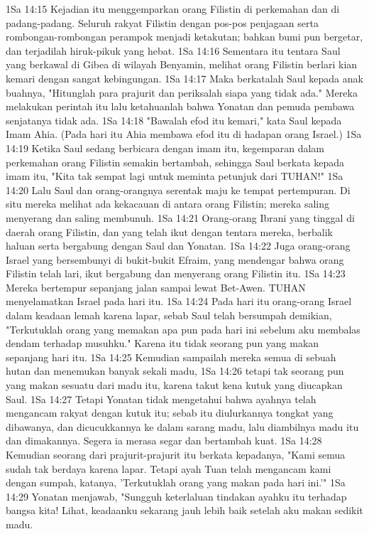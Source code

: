 1Sa 14:15  Kejadian itu menggemparkan orang Filistin di perkemahan dan di padang-padang. Seluruh rakyat Filistin dengan pos-pos penjagaan serta rombongan-rombongan perampok menjadi ketakutan; bahkan bumi pun bergetar, dan terjadilah hiruk-pikuk yang hebat.
1Sa 14:16  Sementara itu tentara Saul yang berkawal di Gibea di wilayah Benyamin, melihat orang Filistin berlari kian kemari dengan sangat kebingungan.
1Sa 14:17  Maka berkatalah Saul kepada anak buahnya, "Hitunglah para prajurit dan periksalah siapa yang tidak ada." Mereka melakukan perintah itu lalu ketahuanlah bahwa Yonatan dan pemuda pembawa senjatanya tidak ada.
1Sa 14:18  "Bawalah efod itu kemari," kata Saul kepada Imam Ahia. (Pada hari itu Ahia membawa efod itu di hadapan orang Israel.)
1Sa 14:19  Ketika Saul sedang berbicara dengan imam itu, kegemparan dalam perkemahan orang Filistin semakin bertambah, sehingga Saul berkata kepada imam itu, "Kita tak sempat lagi untuk meminta petunjuk dari TUHAN!"
1Sa 14:20  Lalu Saul dan orang-orangnya serentak maju ke tempat pertempuran. Di situ mereka melihat ada kekacauan di antara orang Filistin; mereka saling menyerang dan saling membunuh.
1Sa 14:21  Orang-orang Ibrani yang tinggal di daerah orang Filistin, dan yang telah ikut dengan tentara mereka, berbalik haluan serta bergabung dengan Saul dan Yonatan.
1Sa 14:22  Juga orang-orang Israel yang bersembunyi di bukit-bukit Efraim, yang mendengar bahwa orang Filistin telah lari, ikut bergabung dan menyerang orang Filistin itu.
1Sa 14:23  Mereka bertempur sepanjang jalan sampai lewat Bet-Awen. TUHAN menyelamatkan Israel pada hari itu.
1Sa 14:24  Pada hari itu orang-orang Israel dalam keadaan lemah karena lapar, sebab Saul telah bersumpah demikian, "Terkutuklah orang yang memakan apa pun pada hari ini sebelum aku membalas dendam terhadap musuhku." Karena itu tidak seorang pun yang makan sepanjang hari itu.
1Sa 14:25  Kemudian sampailah mereka semua di sebuah hutan dan menemukan banyak sekali madu,
1Sa 14:26  tetapi tak seorang pun yang makan sesuatu dari madu itu, karena takut kena kutuk yang diucapkan Saul.
1Sa 14:27  Tetapi Yonatan tidak mengetahui bahwa ayahnya telah mengancam rakyat dengan kutuk itu; sebab itu diulurkannya tongkat yang dibawanya, dan dicucukkannya ke dalam sarang madu, lalu diambilnya madu itu dan dimakannya. Segera ia merasa segar dan bertambah kuat.
1Sa 14:28  Kemudian seorang dari prajurit-prajurit itu berkata kepadanya, "Kami semua sudah tak berdaya karena lapar. Tetapi ayah Tuan telah mengancam kami dengan sumpah, katanya, 'Terkutuklah orang yang makan pada hari ini.'"
1Sa 14:29  Yonatan menjawab, "Sungguh keterlaluan tindakan ayahku itu terhadap bangsa kita! Lihat, keadaanku sekarang jauh lebih baik setelah aku makan sedikit madu.
